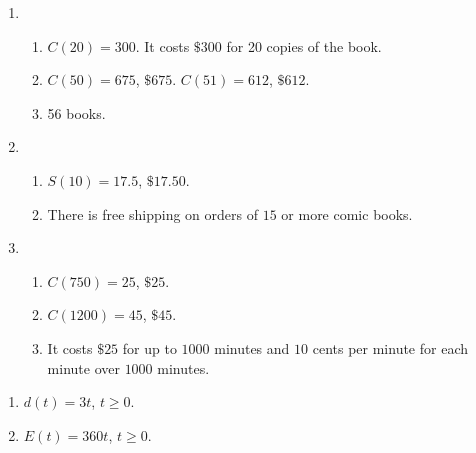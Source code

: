 \begin{enumerate}

\setcounter{enumi}{\value{HW}}


\item
                                     
                                     
\begin{enumerate}

\item   $C(20) = 300$.  It costs $\$300$ for 20 copies of the book.

\item $C(50) = 675$, $\$ 675$.  $C(51) = 612$, $\$ 612$.

\item   56 books.

\end{enumerate}

\item 
                                     
\begin{enumerate}

\item   $S(10) = 17.5$, $\$ 17.50$.

\item  There is free shipping on orders of $15$ or more comic books. 
 
\end{enumerate}

\item 
                                     
\begin{enumerate}

\item   $C(750) = 25$, $\$ 25$.

\item   $C(1200) = 45$, $\$ 45$. 

\item  It costs $\$25$ for up to $1000$ minutes and $10$ cents per minute for each minute over $1000$ minutes.
 
\end{enumerate}

\setcounter{HW}{\value{enumi}}
\end{enumerate}


\begin{multicols}{2}
\begin{enumerate}
\setcounter{enumi}{\value{HW}}

\item  $d(t) = 3t$, $t \geq 0$.
\item  $E(t) = 360t$, $t \geq 0$.

\setcounter{HW}{\value{enumi}}
\end{enumerate}
\end{multicols}

